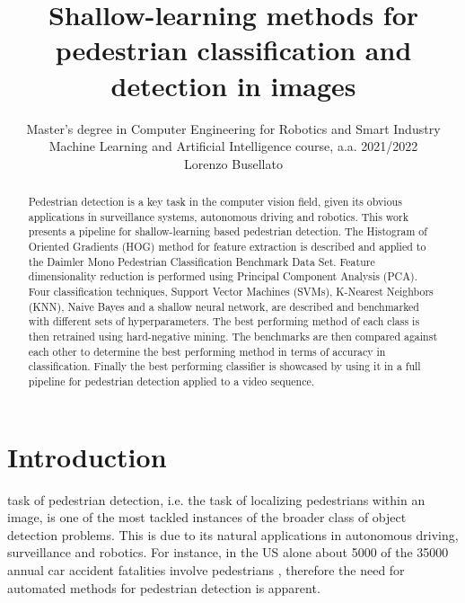 \documentclass[journal,twocolumn]{IEEEtran}
\begin{document}
\title{Shallow-learning methods for pedestrian classification and detection in images}

\author[1]{Master’s degree in Computer Engineering for Robotics and Smart Industry\\Machine Learning and Artificial Intelligence course, a.a. 2021/2022\\ Lorenzo Busellato}%
\onecolumn

\maketitle
\begin{abstract} Pedestrian detection is a key task in the computer vision field, given its obvious applications in surveillance systems, autonomous driving and robotics. 
This work presents a pipeline for shallow-learning based pedestrian detection. The Histogram of Oriented Gradients (HOG)
method for feature extraction is described and applied to the Daimler Mono Pedestrian Classification Benchmark Data Set. Feature dimensionality reduction is performed using Principal Component Analysis (PCA). Four classification techniques, Support Vector Machines (SVMs), K-Nearest Neighbors (KNN), Naive Bayes and a shallow neural network, are described and benchmarked with different sets of hyperparameters. The best performing method of each class is then retrained using hard-negative mining. The benchmarks are then compared against each other to determine the best performing method in terms of accuracy in classification. Finally the best performing classifier is showcased by using it in a full pipeline for pedestrian detection applied to a video sequence.
\end{abstract}
  \tableofcontents
  \clearpage
  \twocolumn

\IEEEpeerreviewmaketitle

\section{Introduction}
 task of pedestrian detection, i.e. the task of localizing pedestrians within an image, is one of the most tackled
instances of the broader class of object detection problems.
This is due to its natural applications in autonomous driving,
surveillance and robotics. For instance, in the US alone about
5000 of the 35000 annual car accident fatalities involve
pedestrians \cite{1}, therefore the need for automated methods for
pedestrian detection is apparent.
\end{document}
